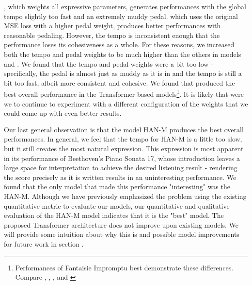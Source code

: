 , which weights all expressive parameters, generates performances with the global tempo slightly too fast and an extremely muddy pedal.  which uses the original MSE loss with a higher pedal weight, produces better performances with reasonable pedaling. However, the tempo is inconsistent enough that the performance loses its cohesiveness as a whole. For these reasons, we increased both the tempo and pedal weights to be much higher than the others in models  and . We found that the tempo and pedal weights  were a bit too low - specifically, the pedal is almost just as muddy as it is in  and the tempo is still a bit too fast, albeit more consistent and cohesive. We found that  produced the best overall performance in the Transformer based models\footnote{Performances of Fantaisie Impromptu best demonstrate these differences. Compare \href{https://ui.neptune.ai/richt3211/thesis/e/THESIS-154/artifacts}{}, \href{https://ui.neptune.ai/richt3211/thesis/e/THESIS-150/artifacts}{}, \href{https://ui.neptune.ai/richt3211/thesis/e/THESIS-156/artifacts}{}, and \href{https://ui.neptune.ai/richt3211/thesis/e/THESIS-157/artifacts}{} }. It is likely that were we to continue to experiment with a different configuration of the weights that we could come up with even better results. 

Our last general observation is that the \vnet{} model HAN-M produces the best overall performances. In general, we feel that the tempo for HAN-M is a little too slow, but it still creates the most natural expression. This expression is most apparent in its performance of Beethoven's Piano Sonata 17, whose introduction leaves a large space for interpretation to achieve the desired listening result - rendering the score precisely as it is written results in an uninteresting performance. We found that the only model that made this performance "interesting" was the HAN-M. Although we have previously emphasized the problem using the existing quantitative metric to evaluate our models, our quantitative and qualitative evaluation of the HAN-M model indicates that it is the "best" model. The proposed Transformer architecture does not improve upon existing models. We will provide some intuition about why this is and possible model improvements for future work in section . 





